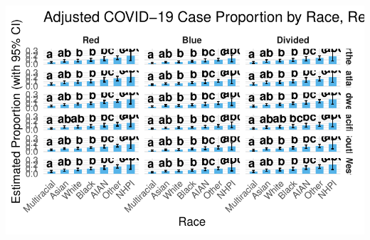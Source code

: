 \documentclass[
  letterpaper,
  DIV=11,
  numbers=noendperiod]{scrartcl}
\begin{document}
\includegraphics{StatsForFinalCSV_files/figure-pdf/unnamed-chunk-17-1.pdf}
\end{document}
